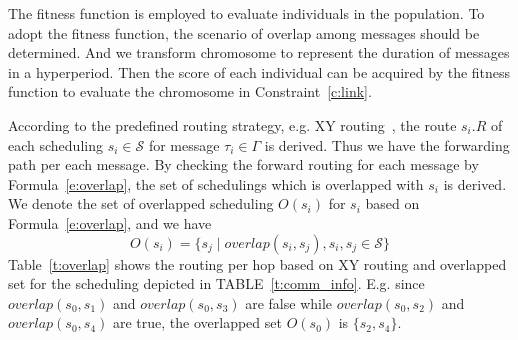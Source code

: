 \documentclass[10pt,journal]{IEEEtran}
\newcommand{\calS}{\mathcal{S}}
\theoremstyle{remark}
\begin{document}
The fitness function is employed to evaluate individuals in the population.
To adopt the fitness function, 
the scenario of overlap among messages should be determined.
And we transform chromosome to represent the duration of messages in a hyperperiod.
Then the score of each individual can be acquired by the fitness function to evaluate the chromosome in Constraint~\ref{c:link}.

According to the predefined routing strategy,
e.g. XY routing~\cite{DBLP:books/daglib/0087651},
the route $s_i.R$ of each scheduling $s_i\in \calS$ for message $\tau_i\in\Gamma$ is derived.
Thus we have the forwarding path per each message.
By checking the forward routing for each message by Formula~\ref{e:overlap},
the set of schedulings which is overlapped with $s_i$ is derived.
We denote the set of overlapped scheduling $O(s_i)$ for $s_i$ based on Formula~\ref{e:overlap},
and we have
\begin{equation*}
O(s_i) = \{ s_j \mid overlap(s_i,s_j),s_i,s_j\in \calS  \}
\end{equation*}
Table~\ref{t:overlap} shows the routing per hop based on XY routing and overlapped set for the scheduling depicted in TABLE~\ref{t:comm_info}.
E.g. since $overlap(s_{0},s_{1})$ and $overlap(s_{0},s_{3})$ are false while $overlap(s_{0},s_{2})$ and $overlap(s_{0},s_{4})$ are true, the overlapped set $O(s_{0})$ is $\{ s_{2},s_{4} \}$. 
\end{document}
